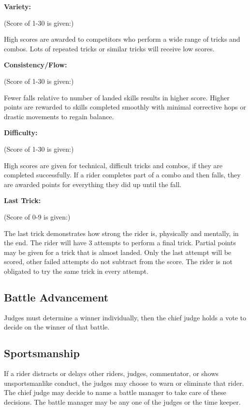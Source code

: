\textbf{Variety:}

(Score of 1-30 is given:)

High scores are awarded to competitors who perform a wide range of tricks and combos.
Lots of repeated tricks or similar tricks will receive low scores.

\textbf{Consistency/Flow:}

(Score of 1-30 is given:)

Fewer falls relative to number of landed skills results in higher score.
Higher points are rewarded to skills completed smoothly with minimal corrective hops or drastic movements to regain balance.

\textbf{Difficulty:}

(Score of 1-30 is given:)

High scores are given for technical, difficult tricks and combos, if they are completed successfully.
If a rider completes part of a combo and then falls, they are awarded points for everything they did up until the fall. 

\textbf{Last Trick:}

(Score of 0-9 is given:)

The last trick demonstrates how strong the rider is, physically and mentally, in the end.
The rider will have 3 attempts to perform a final trick.
Partial points may be given for a trick that is almost landed.
Only the last attempt will be scored, other failed attempts do not subtract from the score.
The rider is not obligated to try the same trick in every attempt.

\subsection{Battle Advancement \label{subsec:flat-street_flatland-judging-scoring_battle}}
Judges must determine a winner individually, then the chief judge holds a vote to decide on the winner of that battle.

\subsection{Sportsmanship}
If a rider distracts or delays other riders, judges, commentator, or shows unsportsmanlike conduct, the judges may choose to warn or eliminate that rider.
The chief judge may decide to name a battle manager to take care of these decisions.
The battle manager may be any one of the judges or the time keeper.


